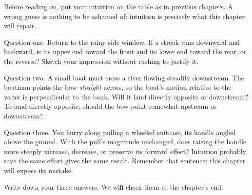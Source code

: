 Before reading on, put your intuition on the table as in previous chapters. A wrong guess is nothing to be ashamed of: intuition is precisely what this chapter will repair.

Question one. Return to the rainy side window. If a streak runs downward and backward, is its upper end toward the front and its lower end toward the rear, or the reverse? Sketch your impression without rushing to justify it.

Question two. A small boat must cross a river flowing steadily downstream. The boatman points the bow \emph{straight} across, so the boat's motion relative to the water is perpendicular to the bank. Will it land directly opposite or downstream? To land directly opposite, should the bow point somewhat upstream or downstream?

Question three. You hurry along pulling a wheeled suitcase, its handle angled above the ground. With the pull's magnitude unchanged, does raising the handle more steeply increase, decrease, or preserve its forward effect? Intuition probably says the same effort gives the same result. Remember that sentence; this chapter will expose its mistake.

Write down your three answers. We will check them at the chapter's end.



